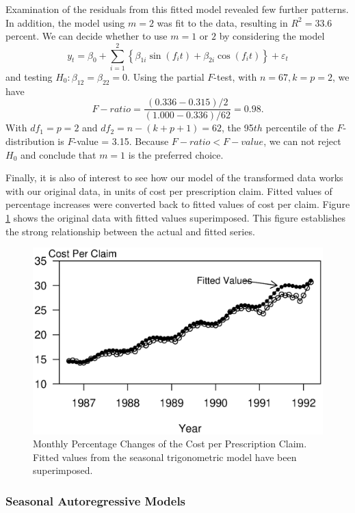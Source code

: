 Examination of the residuals from this fitted model revealed few
further patterns. In addition, the model using $m=2$ was fit to the
data, resulting in $R^2 = 33.6$ percent. We can decide whether to
use $m=1$ or $2$ by considering the model
\begin{equation*}
y_t = \beta_0 + \sum_{i=1}^2 \left\{ \beta_{1i} \sin (f_i t) +
\beta_{2i} \cos (f_i t)\right\} + \varepsilon_t
\end{equation*}
and testing $H_0:\beta_{12} = \beta_{22}=0$. Using the partial
$F$-test, with $n=67, k=p=2$, we have
\begin{equation*}
F-ratio=\frac{(0.336-0.315)/2}{(1.000-0.336)/62} = 0.98.
\end{equation*}
With $df_1=p=2$ and $df_2=n-(k+p+1)=62$, the 95$th$ percentile of
the $F$-distribution is $F$-value = 3.15. Because $F-ratio<F-value$,
we can not reject $H_0$ and conclude that $m=1$ is the preferred
choice.

Finally, it is also of interest to see how our model of the
transformed data works with our original data, in units of cost per
prescription claim. Fitted values of percentage increases were
converted back to fitted values of cost per claim. Figure
\ref{F9:NJPrescFits} shows the original data with fitted values
superimposed. This figure establishes the strong relationship
between the actual and fitted series.


\begin{figure}[htp]
  \begin{center}
    \includegraphics[width=.6\textwidth]
     {Chapter9Forecasting/NJPrescFits.eps}
    \caption{\label{F9:NJPrescFits} \small Monthly Percentage Changes of the Cost per Prescription
Claim. Fitted values from the seasonal trigonometric model have been
superimposed.}
  \end{center}
\end{figure}

\linejed

\subsubsection*{Seasonal Autoregressive Models}

